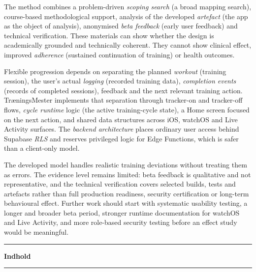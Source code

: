 \documentclass[10pt,a4paper,twoside]{article}
\makeatletter
\renewcommand{\contentsname}{Indhold}
\newcommand{\tmplainheading}[1]{%
  \clearpage
  \thispagestyle{plain}%
  \begingroup
  \setlength{\parskip}{0pt}%
  \vspace*{1.4cm}%
  \noindent\rule{\textwidth}{0.4pt}\par
  \vspace{0.45ex}%
  \noindent\hfill{\normalfont\normalsize\bfseries #1}\par
  \vspace{0.45ex}%
  \noindent\rule{\textwidth}{0.4pt}\par
  \endgroup
  \vspace{0.85cm}%
}
\renewcommand\tableofcontents{%
  \tmplainheading{\contentsname}%
  \@starttoc{toc}%
}
\makeatother
\begin{document}
The method combines a problem-driven \emph{scoping search} (a broad mapping search), course-based methodological support, analysis of the developed \emph{artefact} (the app as the object of analysis), anonymised \emph{beta feedback} (early user feedback) and technical verification. These materials can show whether the design is academically grounded and technically coherent. They cannot show clinical effect, improved \emph{adherence} (sustained continuation of training) or health outcomes.

Flexible progression depends on separating the planned \emph{workout} (training session), the user's actual \emph{logging} (recorded training data), \emph{completion events} (records of completed sessions), feedback and the next relevant training action. TræningsMester implements that separation through tracker-on and tracker-off flows, \emph{cycle runtime} logic (the active training-cycle state), a Home screen focused on the next action, and shared data structures across iOS, watchOS and Live Activity surfaces. The \emph{backend architecture} places ordinary user access behind Supabase \emph{RLS} and reserves privileged logic for Edge Functions, which is safer than a client-only model.

The developed model handles realistic training deviations without treating them as errors. The evidence level remains limited: beta feedback is qualitative and not representative, and the technical verification covers selected builds, tests and artefacts rather than full production readiness, security certification or long-term behavioural effect. Further work should start with systematic usability testing, a longer and broader beta period, stronger runtime documentation for watchOS and Live Activity, and more role-based security testing before an effect study would be meaningful.

\newpage

\addcontentsline{toc}{section}{\contentsname}
\tableofcontents
\clearpage


\clearpage

\setcounter{page}{1}












\end{document}
